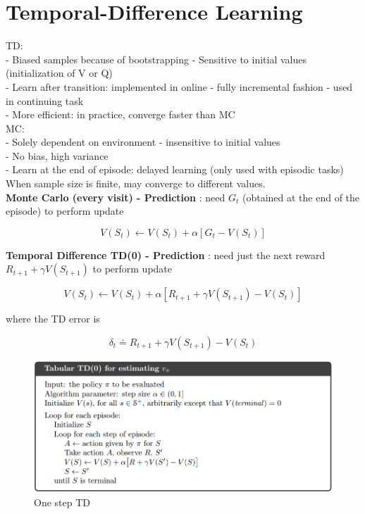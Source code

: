\documentclass{article}
\begin{document}
\newpage
\noindent
\section{Temporal-Difference Learning}

\noindent
TD:\\
- Biased samples because of bootstrapping - Sensitive to initial values
(initialization of V or Q)\\
- Learn after transition: implemented in online - fully incremental fashion -
used in continuing task\\
- More efficient: in practice, converge faster than MC\\

\noindent
MC:\\
- Solely dependent on environment - insensitive to initial values\\
- No bias, high variance\\
- Learn at the end of episode: delayed learning (only used with episodic tasks)\\

\noindent
When sample size is finite, may converge to different values.\\

\noindent
\textbf{Monte Carlo (every visit) - Prediction}
: need $G_{t}$ (obtained at the end of the episode) to perform update

\begin{equation}
V\left(S_{t}\right) \leftarrow V\left(S_{t}\right)+\alpha\left[G_{t}-V\left(S_{t}\right)\right]
\end{equation}

\noindent
\textbf{Temporal Difference TD(0) - Prediction}
: need just the next reward $R_{t+1}+\gamma V\left(S_{t+1}\right)$ to perform
update

\begin{equation}
V\left(S_{t}\right) \leftarrow V\left(S_{t}\right)+\alpha\left[R_{t+1}+\gamma V\left(S_{t+1}\right)-V\left(S_{t}\right)\right]
\end{equation}

\noindent
where the TD error is 

\begin{equation}
\delta_{t} \doteq R_{t+1}+\gamma V\left(S_{t+1}\right)-V\left(S_{t}\right)
\end{equation}

\begin{figure}[h]
\includegraphics[scale=0.4]{onestep_td}
\centering
\caption{One step TD}
\end{figure}
\end{document}
